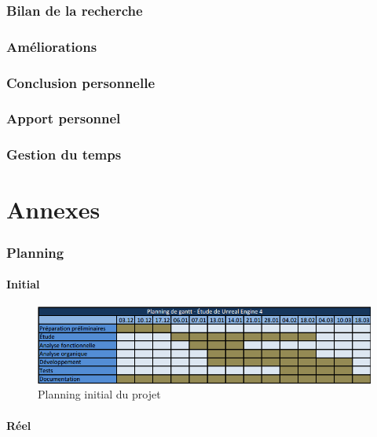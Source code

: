 \documentclass[11pt, a4paper, oneside]{article}
\begin{document}
\section{Bilan de la recherche}
\section{Améliorations}
\section{Conclusion personnelle}
\section{Apport personnel}
\section{Gestion du temps}
\newpage
\part{Annexes}
\section{Planning}
\subsection{Initial}
\begin{figure}[h]
	\begin{center}
	\includegraphics[scale=.924, angle=90]{planninggantt}
	\caption{Planning initial du projet}
	\label{planningintial}
	\end{center}
\end{figure}
\newpage
\subsection{Réel}
\newpage
\end{document}
